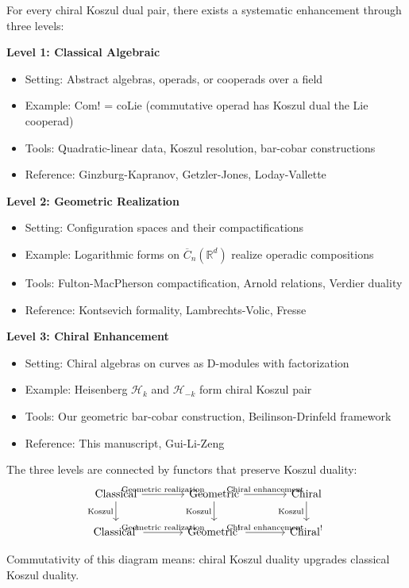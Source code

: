 \begin{definition}\label{def:three-level-hierarchy}
For every chiral Koszul dual pair, there exists a systematic enhancement through three levels:

\textbf{Level 1: Classical Algebraic}
\begin{itemize}
\item Setting: Abstract algebras, operads, or cooperads over a field
\item Example: Com! = coLie (commutative operad has Koszul dual the Lie cooperad)
\item Tools: Quadratic-linear data, Koszul resolution, bar-cobar constructions
\item Reference: Ginzburg-Kapranov, Getzler-Jones, Loday-Vallette
\end{itemize}

\textbf{Level 2: Geometric Realization}
\begin{itemize}
\item Setting: Configuration spaces and their compactifications
\item Example: Logarithmic forms on $\overline{C}_n(\mathbb{R}^d)$ realize operadic compositions
\item Tools: Fulton-MacPherson compactification, Arnold relations, Verdier duality
\item Reference: Kontsevich formality, Lambrechts-Volic, Fresse
\end{itemize}

\textbf{Level 3: Chiral Enhancement}
\begin{itemize}
\item Setting: Chiral algebras on curves as D-modules with factorization
\item Example: Heisenberg $\mathcal{H}_k$ and $\mathcal{H}_{-k}$ form chiral Koszul pair
\item Tools: Our geometric bar-cobar construction, Beilinson-Drinfeld framework
\item Reference: This manuscript, Gui-Li-Zeng
\end{itemize}
\end{definition}

\begin{theorem}\label{thm:hierarchy-functorial}
The three levels are connected by functors that preserve Koszul duality:
$$\begin{tikzcd}[column sep=large]
\text{Classical} \arrow[r, "\text{Geometric realization}"] \arrow[d, "\text{Koszul}"'] 
  & \text{Geometric} \arrow[r, "\text{Chiral enhancement}"] \arrow[d, "\text{Koszul}"'] 
  & \text{Chiral} \arrow[d, "\text{Koszul}"'] \\
\text{Classical}^! \arrow[r, "\text{Geometric realization}"] 
  & \text{Geometric}^! \arrow[r, "\text{Chiral enhancement}"] 
  & \text{Chiral}^!
\end{tikzcd}$$

Commutativity of this diagram means: chiral Koszul duality upgrades classical Koszul duality.
\end{theorem}

